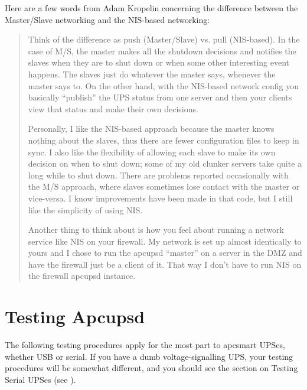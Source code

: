 Here are a few words from Adam Kropelin concerning the difference between the
Master/Slave networking and the NIS-based networking:  

\begin{quotation}
Think of the difference as push (Master/Slave) vs. pull (NIS-based). In the
case of M/S, the master makes all the shutdown decisions and notifies the
slaves when they are to shut down or when some other interesting event
happens. The slaves just do whatever the master says, whenever the master says
to. On the other hand, with the NIS-based network config you basically
``publish'' the UPS status from one server and then your clients view that
status and make their own decisions.  

Personally, I like the NIS-based approach because the master knows nothing
about the slaves, thus there are fewer configuration files to keep in sync. I
also like the flexibility of allowing each slave to make its own decision on
when to shut down; some of my old clunker servers take quite a long while to
shut down. There are problems reported occasionally with the M/S approach,
where slaves sometimes lose contact with the master or vice-versa. I know
improvements have been made in that code, but I still like the simplicity of
using NIS.  

Another thing to think about is how you feel about running a network service
like NIS on your firewall. My network is set up almost identically to yours
and I chose to run the apcupsd ``master'' on a server in the DMZ and have the
firewall just be a client of it. That way I don't have to run NIS on the
firewall apcupsd instance. 
\end{quotation}

\label{Testing-Apcupsd}

\section*{Testing Apcupsd}

\label{index-Testing-84}
The following testing procedures apply for the most part to apcsmart UPSes,
whether USB or serial.  If you have a dumb voltage-signalling UPS, your
testing procedures will be somewhat different, and you should see the section
on Testing Serial UPSes (see 
). 

\label{Process_002dStatus-Test}

